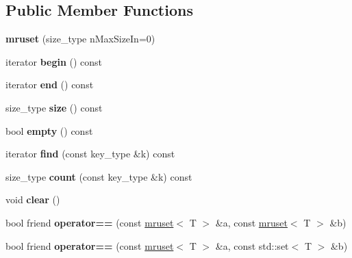\subsection*{Public Member Functions}
\begin{DoxyCompactItemize}
\item 
\mbox{\label{classmruset_a708b11a33448c283f6f4c8e18fd3098f}} 
{\bfseries mruset} (size\+\_\+type n\+Max\+Size\+In=0)
\item 
\mbox{\label{classmruset_a778f8d3dc53ce8e76abb2f88ab42b3ad}} 
iterator {\bfseries begin} () const
\item 
\mbox{\label{classmruset_ac93f008bbc701f8c9512f6f1d8ae1d24}} 
iterator {\bfseries end} () const
\item 
\mbox{\label{classmruset_a9b1cd4454d0399085c4ec9ddb8611011}} 
size\+\_\+type {\bfseries size} () const
\item 
\mbox{\label{classmruset_a94f290b3990c91c3606ab11935cee849}} 
bool {\bfseries empty} () const
\item 
\mbox{\label{classmruset_abe8cc5d73bc6efad0bdaf4fa51bcc362}} 
iterator {\bfseries find} (const key\+\_\+type \&k) const
\item 
\mbox{\label{classmruset_aff65b732aed809fb84542e1136321a24}} 
size\+\_\+type {\bfseries count} (const key\+\_\+type \&k) const
\item 
\mbox{\label{classmruset_ac7a85b54646e9d9d1962ce7f30b2a1fc}} 
void {\bfseries clear} ()
\item 
\mbox{\label{classmruset_aced009504f86176bd82426aa24a38e37}} 
bool friend {\bfseries operator==} (const \mbox{\hyperlink{classmruset}{mruset}}$<$ T $>$ \&a, const \mbox{\hyperlink{classmruset}{mruset}}$<$ T $>$ \&b)
\item 
\mbox{\label{classmruset_a4d7231441276ef8a6c0fa3edf9712f5c}} 
bool friend {\bfseries operator==} (const \mbox{\hyperlink{classmruset}{mruset}}$<$ T $>$ \&a, const std\+::set$<$ T $>$ \&b)
\item 

\end{DoxyCompactItemize}
